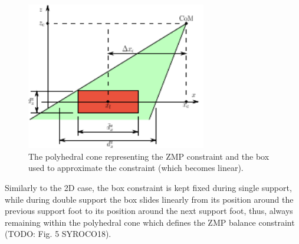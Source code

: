 \begin{figure}
    \centering
    \includegraphics[width=0.7\textwidth]{figures/polyhedral-cone-side-view.pdf}
    \caption{The polyhedral cone representing the ZMP constraint and the 
        box used to approximate the constraint (which becomes linear).}
    \label{fig:polyhedral-cone-side-view}
\end{figure}
Similarly to the 2D case, the box constraint is kept fixed during
single support, while during double support the box 
slides linearly from its position around the previous support foot to its 
position around the next support foot, thus, always remaining within the 
polyhedral cone which defines the ZMP balance constraint
(TODO: Fig. 5 SYROCO18).


